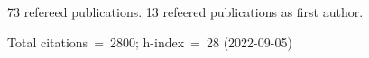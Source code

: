73 refereed publications. 13 refeered publications as first author.

Total citations~=~2800; h-index~=~28 (2022-09-05)